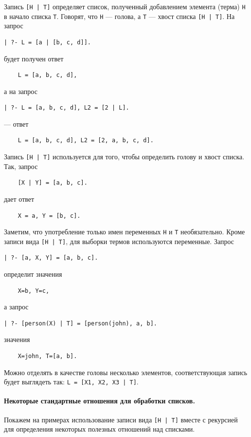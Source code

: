 \documentclass[12pt, openany, twoside]{book} %
\begin{document}
Запись {\tt [H | T]} определяет список, полученный добавлением элемента (терма) {\tt Н} в начало списка {\tt Т}. Говорят, что {\tt Н} --- голова, а {\tt Т} --- хвост списка {\tt [H | T]}. На запрос
{\tt\begin{verbatim}
| ?- L = [a | [b, c, d]].
\end{verbatim}}
\noindent будет получен ответ
{\tt\begin{verbatim}
    L = [a, b, c, d],
\end{verbatim}}
\noindent а на запрос
{\tt\begin{verbatim}
| ?- L = [a, b, c, d], L2 = [2 | L].
\end{verbatim}}
\noindent --- ответ
{\tt\begin{verbatim}
    L = [a, b, c, d], L2 = [2, a, b, c, d].
\end{verbatim}}

Запись {\tt [Н | Т]} используется для того, чтобы определить голову и хвост списка. Так, запрос
{\tt\begin{verbatim}
    [X | Y] = [a, b, c].
\end{verbatim}}
\noindent дает ответ
{\tt\begin{verbatim}
    Х = а, Y = [b, c].
\end{verbatim}}

Заметим, что употребление только имен переменных {\tt Н} и {\tt Т} необязательно. Кроме записи вида {\tt [H | T]}, для выборки термов используются переменные. Запрос
{\tt\begin{verbatim}
| ?- [a, X, Y] = [a, b, c].
\end{verbatim}}
\noindent определит значения
{\tt\begin{verbatim}
    X=b, Y=c,
\end{verbatim}}
\noindent а запрос
{\tt\begin{verbatim}
| ?- [person(Х) | Т] = [person(john), а, b].
\end{verbatim}}
\noindent значения
{\tt\begin{verbatim}
    Х=john, Т=[а, b].
\end{verbatim}}

Можно отделять в качестве головы несколько элементов, соответствующая запись будет выглядеть так: {\tt L = [X1, X2, X3 | T]}.

\paragraph{Некоторые стандартные отношения для обработки списков.} Покажем на примерах использование записи вида {\tt [Н | T]} вместе с рекурсией для определения некоторых полезных отношений над списками.
\end{document}
